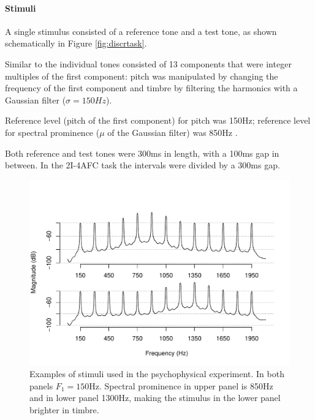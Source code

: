\documentclass{article}\usepackage{knitr}
\begin{document}
\paragraph{Stimuli}

A single stimulus consisted of a reference tone and a test tone, as shown schematically in Figure \ref{fig:discrtask}. 

Similar to \citet{silbert2009} the individual tones consisted of 13 components that were integer multiples of the first component: pitch was manipulated by changing the frequency of the first component and timbre by filtering the harmonics with a Gaussian filter ($\sigma = 150Hz$).

Reference level (pitch of the first component) for pitch was 150Hz; reference level for spectral prominence ($\mu$ of the Gaussian filter) was 850Hz .

Both reference and test tones were 300ms in length, with a 100ms gap in between. In the 2I-4AFC task the intervals were divided by a 300ms gap.

\begin{figure}
\centering
\begin{knitrout}
\color{fgcolor}
\includegraphics[width=\maxwidth]{figure/unnamed-chunk-17-1} 
\end{knitrout}

\caption{Examples of stimuli used in the psychophysical experiment. In both panels $F_1 = 150\text{Hz}$. Spectral prominence in upper panel is 850Hz and in lower panel 1300Hz, making the stimulus in the lower panel brighter in timbre.}
\label{fig:stimuli}
\end{figure}
\end{document}
